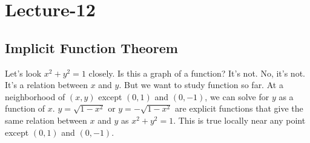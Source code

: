\newpage
\section{Lecture-12}
\subsection{Implicit Function Theorem}
Let's look $x^2+y^2=1$ closely. Is this a graph of a function? It's not.
No, it's not. It's a relation between $x$ and $y$. But we want to study function so far. 
At a neighborhood of $(x,y)$ except $(0,1)$ and $(0,-1)$, we can solve for $y$ as a function of $x$. 
$y=\sqrt{1-x^2}$ or $y=-\sqrt{1-x^2}$ are explicit functions that give the same relation between $x$ and $y$
as $x^2+y^2=1$. This is true locally near any point except $(0,1)$ and $(0,-1)$.


